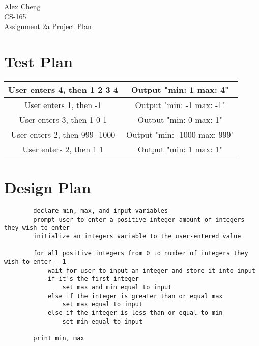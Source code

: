 \documentclass{article}
\begin{document}
	\begin{center}
		Alex Cheng \\
		CS-165 \\
		Assignment 2a Project Plan
	\end{center}
	\section{Test Plan}
	\begin{tabular}{|c|c|}
		\hline
		User enters 4, then 1 2 3 4 & Output "min: 1 max: 4" \\ \hline
		User enters 1, then -1 & Output "min: -1 max: -1" \\ \hline
		User enters 3, then 1 0 1  & Output "min: 0 max: 1" \\ \hline
		User enters 2, then 999 -1000 & Output "min: -1000 max: 999" \\ \hline
		User enters 2, then 1 1 & Output "min: 1 max: 1" \\ \hline
	\end{tabular}
	\section{Design Plan}
	\begin{verbatim}
		declare min, max, and input variables
		prompt user to enter a positive integer amount of integers they wish to enter
		initialize an integers variable to the user-entered value
		
		for all positive integers from 0 to number of integers they wish to enter - 1 
		    wait for user to input an integer and store it into input
		    if it's the first integer
		        set max and min equal to input
		    else if the integer is greater than or equal max 
		        set max equal to input
		    else if the integer is less than or equal to min
		        set min equal to input
		        
		print min, max
	\end{verbatim}
	
\end{document}
